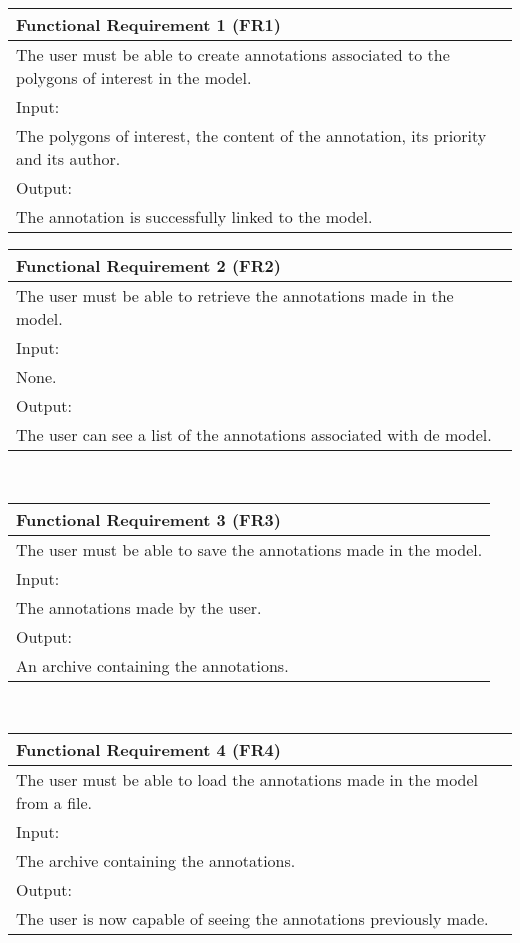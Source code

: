 \begin{center}

\begin{tabular}{p{12.6cm}}
	\hline
	{\Large Functional Requirement 1 (FR1)}\\ \hline \hline
	The user must be able to create annotations associated to the polygons of interest in the model. \\ \hline
	\large{Input:}\\ \hline
	The polygons of interest, the content of the annotation, its priority and its author.\\ \hline \hline
	\large{Output:}\\ \hline
	The annotation is successfully linked to the model.\\ \hline
\end{tabular}
\vspace{10mm}

\begin{tabular}{p{12.6cm}}
	\hline
	{\Large Functional Requirement 2 (FR2)}\\ \hline \hline
	The user must be able to retrieve the annotations made in the model. \\ \hline
	\large{Input:}\\ \hline
	None.\\ \hline \hline
	\large{Output:}\\ \hline
	The user can see a list of the annotations associated with de model.\\
	\hline
\end{tabular}\\
\vspace{10mm}

\begin{tabular}{p{12.6cm}}
	\hline
	{\Large Functional Requirement 3 (FR3)}\\ \hline \hline
	The user must be able to save the annotations made in the model. \\ \hline
	\large{Input:}\\ \hline
	The annotations made by the user.\\ \hline \hline
	\large{Output:}\\ \hline
	An archive containing the annotations.\\
	\hline
\end{tabular}\\
\vspace{10mm}

\begin{tabular}{p{12.6cm}}
	\hline
	{\Large Functional Requirement 4 (FR4)}\\ \hline \hline
	The user must be able to load the annotations made in the model from a file. \\ \hline
	\large{Input:}\\ \hline
	The archive containing the annotations.\\ \hline \hline
	\large{Output:}\\ \hline
	The user is now capable of seeing the annotations previously made.\\
	\hline
\end{tabular}\\
\vspace{10mm}


\end{center}
